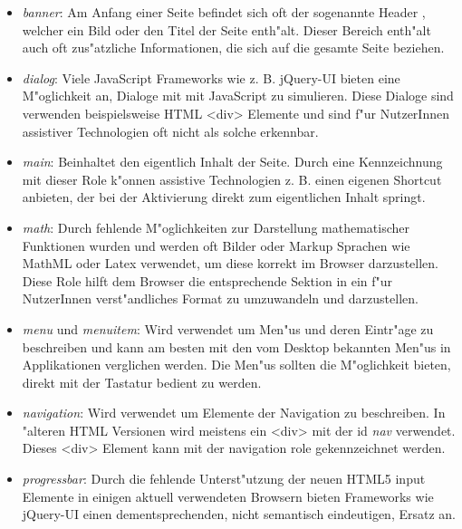 \documentclass[a4paper,bibtotoc,oneside]{scrbook}
\begin{document}
\begin{itemize}
\item \emph{banner}: Am Anfang einer Seite befindet sich oft der sogenannte \glqq Header \grqq, welcher ein Bild oder den Titel der Seite enth"alt. Dieser Bereich enth"alt auch oft zus"atzliche Informationen, die sich auf die gesamte Seite beziehen. \cite[Abschnitt 5.4, banner]{aria_roles}

\item \emph{dialog}: Viele JavaScript Frameworks wie z. B. jQuery-UI \cite{jquery_ui} bieten eine M"oglichkeit an, Dialoge mit mit JavaScript zu simulieren. Diese Dialoge sind verwenden beispielsweise HTML <div> Elemente und sind f"ur NutzerInnen assistiver Technologien oft nicht als solche erkennbar. \cite[Abschnitt 5.4, dialog]{aria_roles}

\item \emph{main}: Beinhaltet den eigentlich Inhalt der Seite. Durch eine Kennzeichnung mit dieser Role k"onnen assistive Technologien z. B. einen eigenen Shortcut anbieten, der bei der Aktivierung direkt zum eigentlichen Inhalt springt. \cite[Abschnitt 5.4, main]{aria_roles}

\item \emph{math}: Durch fehlende M"oglichkeiten zur Darstellung mathematischer Funktionen wurden und werden oft Bilder oder Markup Sprachen wie MathML oder Latex verwendet, um diese korrekt im Browser darzustellen. Diese Role hilft dem Browser die entsprechende Sektion in ein f"ur NutzerInnen verst"andliches Format zu umzuwandeln und darzustellen. \cite[Abschnitt 5.4, math]{aria_roles}

\item \emph{menu} und \emph{menuitem}: Wird verwendet um Men"us und deren Eintr"age zu beschreiben und kann am besten mit den vom Desktop bekannten Men"us in Applikationen verglichen werden. Die Men"us sollten die M"oglichkeit bieten, direkt mit der Tastatur bedient zu werden. \cite[Abschnitt 5.4, menu, menuitem]{aria_roles}

\item \emph{navigation}: Wird verwendet um Elemente der Navigation zu beschreiben. In "alteren HTML Versionen wird meistens ein <div> mit der id \emph{nav} verwendet. Dieses <div> Element kann mit der navigation role gekennzeichnet werden. \cite[Abschnitt 5.4, navigation]{aria_roles}

\item \emph{progressbar}: Durch die fehlende Unterst"utzung der neuen HTML5 input Elemente in einigen aktuell verwendeten Browsern bieten Frameworks wie jQuery-UI\cite{jquery_ui} einen dementsprechenden, nicht semantisch eindeutigen, Ersatz an. \cite[Abschnitt 5.4, progressbar]{aria_roles}


\end{itemize}
\end{document}
